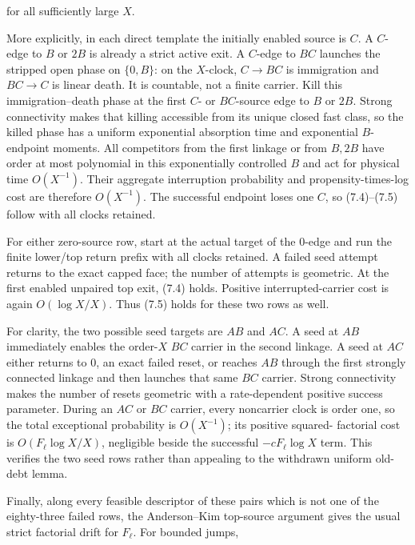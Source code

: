 for all sufficiently large \(X\).

More explicitly, in each direct template the initially enabled source is
\(C\). A \(C\)-edge to \(B\) or \(2B\) is already a strict active exit.
A \(C\)-edge to \(BC\) launches the stripped open phase on \(\{0,B\}\):
on the \(X\)-clock, \(C\to BC\) is immigration and \(BC\to C\) is linear
death. It is countable, not a finite carrier. Kill this
immigration--death phase at the first \(C\)- or \(BC\)-source edge to
\(B\) or \(2B\). Strong connectivity makes that killing accessible from
its unique closed fast class, so the killed phase has a uniform
exponential absorption time and exponential \(B\)-endpoint moments. All
competitors from the first linkage or from \(B,2B\) have order at most
polynomial in this exponentially controlled \(B\) and act for physical
time \(O(X^{-1})\). Their aggregate interruption probability and
propensity-times-log cost are therefore \(O(X^{-1})\). The successful
endpoint loses one \(C\), so (7.4)--(7.5) follow with all clocks
retained.

For either zero-source row, start at the actual target of the \(0\)-edge
and run the finite lower/top return prefix with all clocks retained. A
failed seed attempt returns to the exact capped face; the number of
attempts is geometric. At the first enabled unpaired top exit, (7.4)
holds. Positive interrupted-carrier cost is again \(O(\log X/X)\). Thus
(7.5) holds for these two rows as well.

For clarity, the two possible seed targets are \(AB\) and \(AC\). A seed
at \(AB\) immediately enables the order-\(X\) \(BC\) carrier in the
second linkage. A seed at \(AC\) either returns to \(0\), an exact
failed reset, or reaches \(AB\) through the first strongly connected
linkage and then launches that same \(BC\) carrier. Strong connectivity
makes the number of resets geometric with a rate-dependent positive
success parameter. During an \(AC\) or \(BC\) carrier, every noncarrier
clock is order one, so the total exceptional probability is
\(O(X^{-1})\); its positive squared- factorial cost is
\(O(F_\ell\log X/X)\), negligible beside the successful
\(-cF_\ell\log X\) term. This verifies the two seed rows rather than
appealing to the withdrawn uniform old-debt lemma.

Finally, along every feasible descriptor of these pairs which is not one
of the eighty-three failed rows, the Anderson--Kim top-source argument
gives the usual strict factorial drift for \(F_\ell\). For bounded
jumps,

